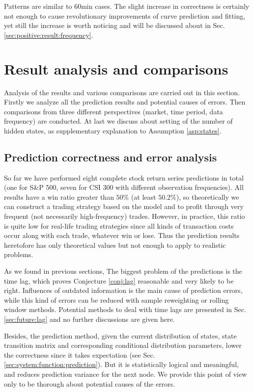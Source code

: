 Patterns are similar to 60min cases.
The slight increase in correctness is certainly not enough to 
cause revolutionary improvements of curve prediction and fitting,
yet still the increase is worth noticing and 
will be discussed about in Sec.\,\ref{sec:positive:result:frequency}.


\section{Result analysis and comparisons}
\label{sec:positive:result}
Analysis of the results and various comparisons are carried out in this section.
Firstly we analyze all the prediction results and potential causes of errors.
Then comparisons from three different perspectives
(market, time period, data frequency) are conducted.
At last we discuss about setting of the number of hidden states,
as supplementary explanation to Assumption \ref{asp:states}. 

\subsection{Prediction correctness and error analysis}
\label{sec:positive:result:prediction}
So far we have performed eight complete stock return series predictions in total
(one for S\&P 500, seven for CSI 300 with different observation frequencies).
All results have a win ratio greater than $50\%$ (at least $50.2\%$),
so theoretically we can construct a trading strategy based on the model
and to profit through very frequent (not necessarily high-frequency) trades.
However, in practice, this ratio is quite low for real-life trading strategies 
since all kinds of transaction costs occur along with each trade, whatever win or lose.
Thus the prediction results heretofore has only theoretical values but 
not enough to apply to realistic problems.

As we found in previous sections, 
The biggest problem of the predictions is the time lag,
which proves Conjecture \ref{conj:lag} reasonable and very likely to be right.
Influences of outdated information is the main cause of prediction errors,
while this kind of errors can be reduced with sample reweighting or rolling window methods.
Potential methods to deal with time lags are presented in Sec.\,\ref{sec:future:lag} 
and no further discussions are given here.

Besides, the prediction method, given the current distribution of states, 
state transition matrix and corresponding conditional distribution parameters,
lower the correctness since it takes expectation (see Sec.\,\ref{sec:system:function:prediction}).
But it is statistically logical and meaningful, 
and reduces prediction variance for the next node.
We provide this point of view only to be thorough about potential causes of the errors.


